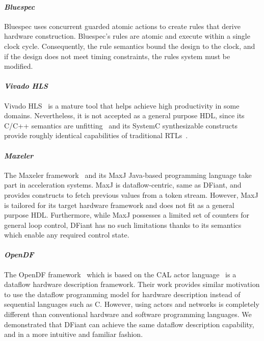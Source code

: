 \paragraph*{\bf \em Bluespec} 
Bluespec uses concurrent guarded atomic actions to create rules that derive hardware construction. Bluespec's rules are atomic and execute within a single clock cycle. Consequently, the rule semantics bound the design to the clock, and if the design does not meet timing constraints, the rules system must be modified.

\paragraph*{\bf \em Vivado HLS} 
Vivado HLS~\cite{Vivado2012} is a mature tool that helps achieve high productivity in some domains. Nevertheless, it is not accepted as a general purpose HDL, since its C/C++ semantics are unfitting~\cite{Zhao2017} and its SystemC synthesizable constructs provide roughly identical capabilities of traditional RTLs~\cite{gajski2010input}.

\paragraph*{\bf \em Maxeler} 
The Maxeler framework~\cite{Pell2011} and its MaxJ Java-based programming language take part in acceleration systems. MaxJ is dataflow-centric, same as DFiant, and provides constructs to fetch previous values from a token stream. However, MaxJ is tailored for its target hardware framework and does not fit as a general purpose HDL. Furthermore, while MaxJ possesses a limited set of counters for general loop control, DFiant has no such limitations thanks to its  semantics which enable any required control state.

\paragraph*{\bf \em OpenDF} 
The OpenDF framework~\cite{bhattacharyya2008opendf} which is based on the CAL actor language~\cite{eker2003cal} is a dataflow hardware description framework. Their work provides similar motivation to use the dataflow programming model for hardware description instead of sequential languages such as C. However, using actors and networks is completely different than conventional hardware and software programming languages. We demonstrated that DFiant can achieve the same dataflow description capability, and in a more intuitive and familiar fashion.
